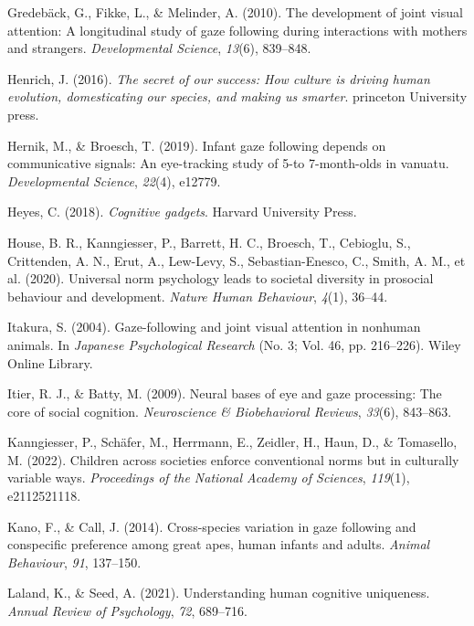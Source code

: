 \documentclass[
  man,floatsintext]{apa7}
\newlength{\cslhangindent}
\newenvironment{CSLReferences}[2] %
 {\begin{list}{}{%
  \setlength{\itemindent}{0pt}
  \setlength{\leftmargin}{0pt}
  \setlength{\parsep}{0pt}
  \ifodd #1
   \setlength{\leftmargin}{\cslhangindent}
   \setlength{\itemindent}{-1\cslhangindent}
  \fi
  \setlength{\itemsep}{#2\baselineskip}}}
 {\end{list}}
\begin{document}
\begin{CSLReferences}{1}{0}
Gredebäck, G., Fikke, L., \& Melinder, A. (2010). The development of joint visual attention: A longitudinal study of gaze following during interactions with mothers and strangers. \emph{Developmental Science}, \emph{13}(6), 839--848.

Henrich, J. (2016). \emph{The secret of our success: How culture is driving human evolution, domesticating our species, and making us smarter}. princeton University press.

Hernik, M., \& Broesch, T. (2019). Infant gaze following depends on communicative signals: An eye-tracking study of 5-to 7-month-olds in vanuatu. \emph{Developmental Science}, \emph{22}(4), e12779.

Heyes, C. (2018). \emph{Cognitive gadgets}. Harvard University Press.

House, B. R., Kanngiesser, P., Barrett, H. C., Broesch, T., Cebioglu, S., Crittenden, A. N., Erut, A., Lew-Levy, S., Sebastian-Enesco, C., Smith, A. M., et al. (2020). Universal norm psychology leads to societal diversity in prosocial behaviour and development. \emph{Nature Human Behaviour}, \emph{4}(1), 36--44.

Itakura, S. (2004). Gaze-following and joint visual attention in nonhuman animals. In \emph{Japanese Psychological Research} (No. 3; Vol. 46, pp. 216--226). Wiley Online Library.

Itier, R. J., \& Batty, M. (2009). Neural bases of eye and gaze processing: The core of social cognition. \emph{Neuroscience \& Biobehavioral Reviews}, \emph{33}(6), 843--863.

Kanngiesser, P., Schäfer, M., Herrmann, E., Zeidler, H., Haun, D., \& Tomasello, M. (2022). Children across societies enforce conventional norms but in culturally variable ways. \emph{Proceedings of the National Academy of Sciences}, \emph{119}(1), e2112521118.

Kano, F., \& Call, J. (2014). Cross-species variation in gaze following and conspecific preference among great apes, human infants and adults. \emph{Animal Behaviour}, \emph{91}, 137--150.

Laland, K., \& Seed, A. (2021). Understanding human cognitive uniqueness. \emph{Annual Review of Psychology}, \emph{72}, 689--716.


\end{CSLReferences}
\end{document}
